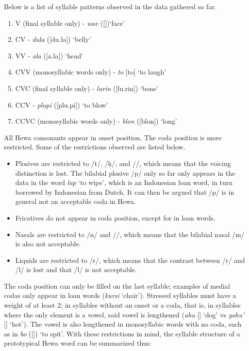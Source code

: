\documentclass[subpreambles=true]{standalone}
\begin{document}
Below is a list of syllable patterns observed in the data gathered so far.

\begin{enumerate}

\item V (final syllable only) - \textit{wae}  ([])`face'
\item CV - \textit{dula} ([du.la]) `belly'
\item VV - \textit{ala} ([a\textlengthmark .la]) `head'
\item CVV (monosyllabic words only) - \textit{to} [to\textlengthmark] `to laugh'
\item CVC (final syllable only) - \textit{lurin} ([lu.rin]) `bone' 
\item CCV - \textit{plupi} ([plu.pi]) `to blow'
\item CCVC (monosyllabic words only) - \textit{blon} ([blon]) `long'

\end{enumerate}

All Hewa consonants appear in onset position. The coda position is more restricted. Some of the restrictions observed are listed below.

\begin{itemize}

\item Plosives are restricted to /t/, /k/, and /\textglotstop /, which means that the voicing distinction is lost. The bilabial plosive /p/ only so far only appears in the data in the word \textit{lap} `to wipe', which is an Indonesian loan word, in turn borrowed by Indonesian from Dutch. It can then be argued that /p/ is in general not an acceptable coda in Hewa.

\item Fricatives do not appear in coda position, except for in loan words.

\item Nasals are restricted to /n/ and //, which means that the bilabial nasal /m/ is also not acceptable.

\item Liquids are restricted to /r/, which means that the contrast between /r/ and /l/ is lost and that /l/ is not acceptable.

\end{itemize}

The coda position can only be filled on the last syllable; examples of medial codas only appear in loan words (\textit{kursi} `chair'). Stressed syllables must have a weight of at least 2; in syllables without an onset or a coda, that is, in syllables where the only element is a vowel, said vowel is lengthened (\textit{ahu} [] `dog' vs \textit{gahu'} [] `hot'). The vowel is also lengthened in monosyllabic words with no coda, such as in  \textit{bo} ([]) `to spit'. With these restrictions in mind, the syllable structure of a prototypical Hewa word can be summarized thus:
\end{document}
